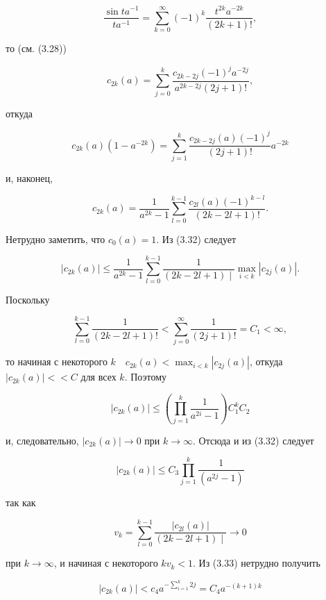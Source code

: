 \documentclass[10pt]{article}
\begin{document}
\begin{equation*}
\frac{\sin t a^{-1}}{t a^{-1}}=\sum_{k=0}^{\infty}(-1)^{k} \frac{t^{2 k} a^{-2 k}}{(2 k+1)!}, \tag{3.30}
\end{equation*}


то (см. (3.28))


\begin{equation*}
c_{2 k}(a)=\sum_{j=0}^{k} \frac{c_{2 k-2 j}(-1)^{j} a^{-2 j}}{a^{2 k-2 j}(2 j+1)!}, \tag{3.31}
\end{equation*}


откуда

$$
c_{2 k}(a)\left(1-a^{-2 k}\right)=\sum_{j=1}^{k} \frac{c_{2 k-2 j}(a)(-1)^{j}}{(2 j+1)!} a^{-2 k}
$$

и, наконец,


\begin{equation*}
c_{2 k}(a)=\frac{1}{a^{2 k}-1} \sum_{l=0}^{k-1} \frac{c_{2 l}(a)(-1)^{k-l}}{(2 k-2 l+1)!} . \tag{3.32}
\end{equation*}


Нетрудно заметить, что $c_{0}(a)=1$. Из (3.32) следует

$$
\left|c_{2 k}(a)\right| \leqslant \frac{1}{a^{2 k}-1} \sum_{l=0}^{k-1} \frac{1}{(2 k-2 l+1) \mid} \max _{i<k}\left|c_{2 j}(a)\right| .
$$

Поскольку

$$
\sum_{l=0}^{k-1} \frac{1}{(2 k-2 l+1)!}<\sum_{j=0}^{\infty} \frac{1}{(2 j+1)!}=C_{1}<\infty,
$$

то начиная с некоторого $k \quad c_{2 k}(a)<\max _{i<k}\left|c_{2 j}(a)\right|$, откуда $\left|c_{2 k}(a)\right|< <C$ для всех $k$. Поэтому

$$
\left|c_{2 k}(a)\right| \leqslant\left(\prod_{j=1}^{k} \frac{1}{a^{2 i}-1}\right) C_{1}^{k} C_{2}
$$

и, следовательно, $\left|c_{2 k}(a)\right| \rightarrow 0$ при $k \rightarrow \infty$. Отсюда и из (3.32) следует


\begin{equation*}
\left|c_{2 k}(a)\right| \leqslant C_{3} \prod_{j=1}^{k} \frac{1}{\left(a^{2 j}-1\right)} \tag{3.33}
\end{equation*}


так как

$$
v_{k}=\sum_{l=0}^{k-1} \frac{\left|c_{2 l}(a)\right|}{(2 k-2 l+1) \mid} \rightarrow 0
$$

при $k \rightarrow \infty$, и начиная с некоторого $k v_{k}<1$. Из (3.33) нетрудно получить


\begin{equation*}
\left|c_{2 k}(a)\right|<c_{4} a^{-\sum_{i=1}^{k} 2 j}=C_{4} a^{-(k+1) k} \tag{3.34}
\end{equation*}
\end{document}
